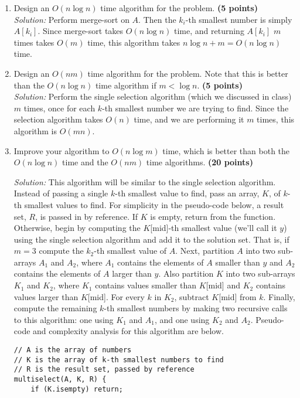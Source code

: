 \documentclass[11pt]{article}
\begin{document}
\begin{enumerate}
\begin{enumerate}
\item
Design an $O(n\log n)$ time algorithm for the problem. {\hfill \bf (5 points)} \\
\textit{Solution:} Perform merge-sort on $A$. Then the $k_i$-th smallest number is simply $A[k_i]$. Since merge-sort takes $O(n\log n)$ time, and returning $A[k_i]$ $m$ times takes $O(m)$ time, this algorithm takes $n\log n + m = O(n \log n)$ time.

\item
Design an $O(nm)$ time algorithm for the problem. Note that this is better than the $O(n\log n)$ time algorithm if $m<\log n$. {\hfill \bf (5 points)} \\
\textit{Solution:} Perform the single selection algorithm (which we discussed in class) $m$ times, once for each $k$-th smallest number we are trying to find. Since the selection algorithm takes $O(n)$ time, and we are performing it $m$ times, this algorithm is $O(mn)$.

\item
Improve your algorithm to $O(n\log m)$ time, which is better than both the $O(n\log n)$ time and the $O(nm)$ time algorithms. {\hfill \bf (20 points)}

\textit{Solution:} This algorithm will be similar to the single selection algorithm. Instead of passing a single $k$-th smallest value to find, pass an array, $K$, of $k$-th smallest values to find. For simplicity in the pseudo-code below, a result set, $R$, is passed in by reference. If $K$ is empty, return from the function. Otherwise, begin by computing the $K$[mid]-th smallest value (we'll call it $y$) using the single selection algorithm and add it to the solution set. That is, if $m=3$ compute the $k_2$-th smallest value of $A$. Next, partition $A$ into two sub-arrays $A_1$ and $A_2$, where $A_1$ contains the elements of $A$ smaller than $y$ and $A_2$ contains the elements of $A$ larger than $y$. Also partition $K$ into two sub-arrays $K_1$ and $K_2$, where $K_1$ contains values smaller than $K$[mid] and $K_2$ contains values larger than $K$[mid]. For every $k$ in $K_2$, subtract $K$[mid] from $k$. Finally, compute the remaining $k$-th smallest numbers by making two recursive calls to this algorithm: one using $K_1$ and $A_1$, and one using $K_2$ and $A_2$. Pseudo-code and complexity analysis for this algorithm are below.
\pagebreak
\begin{verbatim}
// A is the array of numbers
// K is the array of k-th smallest numbers to find
// R is the result set, passed by reference
multiselect(A, K, R) {
    if (K.isempty) return;
    

\end{verbatim}
\end{enumerate}
\end{enumerate}
\end{document}
